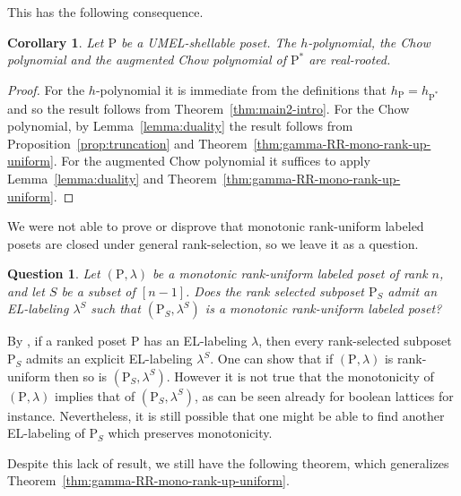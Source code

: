 \documentclass[11pt,a4paper]{amsart}
\theoremstyle{results}
\newtheorem{corollary}[thm]{Corollary}
\theoremstyle{definitions}
\newtheorem{question}[thm]{Question}
\def\P{\mathbb{P}}
\newcommand{\Pdual}{\P^{\ast}}
\renewcommand{\P}{\mathrm{P}}
\begin{document}
This has the following consequence. 
\begin{corollary}
    Let $\P$ be a UMEL-shellable poset. The $h$-polynomial, the Chow polynomial and the augmented Chow polynomial of $\Pdual$ are real-rooted.
\end{corollary}
\begin{proof}
For the $h$-polynomial it is immediate from the definitions that $h_{\P}= h_{\Pdual}$ and so the result follows from Theorem~\ref{thm:main2-intro}. For the Chow polynomial, by Lemma~\ref{lemma:duality} the result follows from Proposition~\ref{prop:truncation} and Theorem~\ref{thm:gamma-RR-mono-rank-up-uniform}. For the augmented Chow polynomial it suffices to apply Lemma~\ref{lemma:duality} and Theorem~\ref{thm:gamma-RR-mono-rank-up-uniform}. 
\end{proof}

We were not able to prove or disprove that monotonic rank-uniform labeled posets are closed under general rank-selection, so we leave it as a question. 

\begin{question}\label{question:rank-selected}
Let $(\P, \lambda)$ be a monotonic rank-uniform labeled poset of rank $n$, and let $S$ be a subset of $[n-1]$. Does the rank selected subposet $\P_S$ admit an EL-labeling $\lambda^S$ such that $(\P_S, \lambda^S)$ is a monotonic rank-uniform labeled poset? 
\end{question}

By  \cite[Theorem 4.1.1]{Li2020LexicographicShellablePosets}, if a ranked poset $\P$ has an EL-labeling $\lambda$, then every rank-selected subposet $\P_S$ admits an explicit EL-labeling $\lambda^S$. One can show that if $(\P, \lambda)$ is rank-uniform then so is $(\P_S, \lambda^S)$. However it is not true that the monotonicity of $(\P, \lambda)$ implies that of $(\P_S, \lambda^S)$, as can be seen already for boolean lattices for instance. Nevertheless, it is still possible that one might be able to find another EL-labeling of $\P_S$ which preserves monotonicity. 

Despite this lack of result, we still have the following theorem, which generalizes Theorem~\ref{thm:gamma-RR-mono-rank-up-uniform}.
\end{document}
